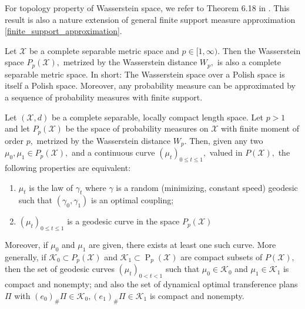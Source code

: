 For topology property of Wasserstein space, we refer to Theorem 6.18 in \cite{villani2008optimal}. This result is also a nature extension of general finite support measure approximation \cref{finite_support_approximation}.
\begin{thm}
	\label{topology_Wasserstein}
	Let \( \mathcal { X } \) be a complete separable metric space and \( p \in [ 1 , \infty ) \). Then the Wasserstein space \( P _ { p } ( \mathcal { X } ) , \) metrized by the Wasserstein distance \( W _ { p } , \) is also a complete separable metric space. In short: The Wasserstein space over a Polish space is itself a Polish space. Moreover, any probability measure can be approximated by a sequence of probability measures with finite support.
\end{thm}

\begin{thm}
	\label{geodesic_Wasserstein_space}
	Let \( ( \mathcal { X } , d ) \) be a complete separable, locally compact length space. Let \( p > 1 \) and let \( P _ { p } ( \mathcal { X } ) \) be the space of probability measures on \( \mathcal { X } \) with finite moment of order \( p , \) metrized by the Wasserstein distance \( W _ { p } . \) Then, given any two \( \mu _ { 0 } , \mu _ { 1 } \in P _ { p } ( \mathcal { X } ) , \) and a continuous curve \( \left( \mu _ { t } \right) _ { 0 \leq t \leq 1 } , \) valued in \( P ( \mathcal { X } ) , \) the following properties are equivalent:
	\begin{enumerate}
		\item \( \mu _ { t } \) is the law of \(\gamma _ { t } \) where \( \gamma \) is a random (minimizing, constant speed) geodesic such that \( \left( \gamma _ { 0 } , \gamma _ { 1 } \right) \) is an optimal coupling;
		\item \( \left( \mu _ { t } \right) _ { 0 \leq t \leq 1 } \) is a geodesic curve in the space \( P _ { p } ( \mathcal { X } ) \)
	\end{enumerate}
	Moreover, if \( \mu _ { 0 } \) and \( \mu _ { 1 } \) are given, there exists at least one such curve.
	More generally, if \( \mathcal { K } _ { 0 } \subset P _ { p } ( \mathcal { X } ) \) and \( \mathcal { K } _ { 1 } \subset \operatorname { P } _ { p } ( \mathcal { X } ) \) are compact subsets of
	\( P ( \mathcal { X } ) , \) then the set of geodesic curves \( \left( \mu _ { t } \right) _ { 0 < t < 1 } \) such that \( \mu _ { 0 } \in \mathcal { K } _ { 0 } \) and
	\( \mu _ { 1 } \in \mathcal { K } _ { 1 } \) is compact and nonempty; and also the set of dynamical optimal transference plans \( \Pi \) with \( \left( e _ { 0 } \right) _ { \# } \Pi \in \mathcal { K } _ { 0 } , \left( e _ { 1 } \right) _ { \# } \Pi \in \mathcal { K } _ { 1 } \) is compact
	and nonempty.
\end{thm}

